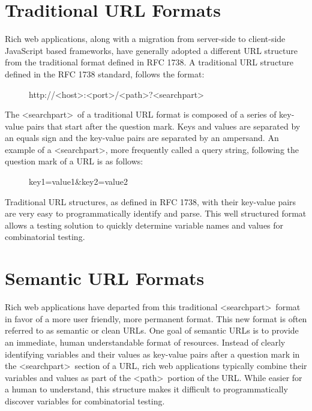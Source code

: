 \section{Traditional URL Formats}
Rich web applications, along with a migration from server-side to client-side JavaScript based frameworks, have generally adopted a different URL structure from the traditional format defined in RFC 1738\cite{berners1994uniform}.  A traditional URL structure defined in the RFC 1738 standard, follows the format:

\begin{figure}[h]
\centering
http://\textless host\textgreater :\textless port\textgreater /\textless path\textgreater ?\textless searchpart\textgreater
\end{figure}

The \textless searchpart\textgreater\ of a traditional URL format is composed of a series of key-value pairs that start after the question mark.  Keys and values are separated by an equals sign and the key-value pairs are separated by an ampersand. An example of a \textless searchpart\textgreater, more frequently called a query string, following the question mark of a URL is as follows:

\begin{figure}[h]
\centering
key1=value1\&key2=value2
\end{figure}

Traditional URL structures, as defined in RFC 1738, with their key-value pairs are very easy to programmatically identify and parse.  This well structured format allows a testing solution to quickly determine variable names and values for combinatorial testing.

\section{Semantic URL Formats}
Rich web applications have departed from this traditional \textless searchpart\textgreater\ format in favor of a more user friendly, more permanent format\cite{tbl2008}.  This new format is often referred to as semantic or clean URLs.  One goal of semantic URLs is to provide an immediate, human understandable format of resources.  Instead of clearly identifying variables and their values as key-value pairs after a question mark in the \textless searchpart\textgreater\ section of a URL, rich web applications typically combine their variables and values as part of the \textless path\textgreater\ portion of the URL.  While easier for a human to understand, this structure makes it difficult to programmatically discover variables for combinatorial testing.

